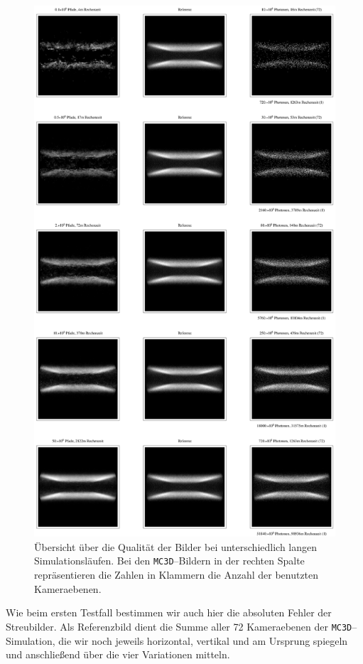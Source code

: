 		\begin{figure}
			\centering
			\includegraphics[height=1.0\textheight]{diskimageoverview.eps}
			\caption{Übersicht über die Qualität der Bilder bei unterschiedlich langen Simulationsläufen. Bei den \texttt{MC3D}--Bildern in der rechten Spalte repräsentieren die Zahlen in Klammern die Anzahl der benutzten Kameraebenen.}
			\label{fig:disk_image_overview}
		\end{figure}
	
	Wie beim ersten Testfall bestimmen wir auch hier die absoluten Fehler der Streubilder. Als Referenzbild dient die Summe aller 72 Kameraebenen der \texttt{MC3D}--Simulation, die wir noch jeweils horizontal, vertikal und am Ursprung spiegeln und anschließend über die vier Variationen mitteln.


